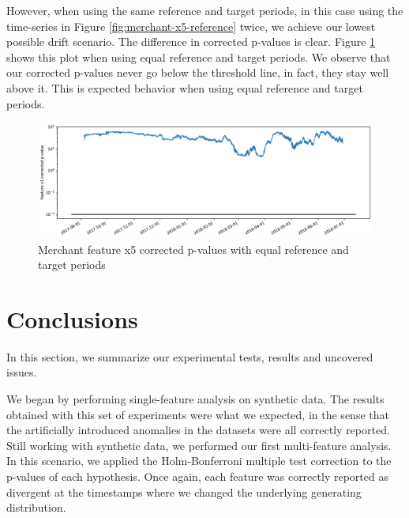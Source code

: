 However, when using the same reference and target periods, in this case using the time-series in Figure \ref{fig:merchant-x5-reference} twice, we achieve our lowest possible drift scenario. The difference in corrected p-values is clear. Figure \ref{fig:merchant2-x5-correctedpvalues} shows this plot when using equal reference and target periods. We observe that our corrected p-values never go below the threshold line, in fact, they stay well above it. This is expected behavior when using equal reference and target periods.
\begin{figure}[!htb]
    \begin{center}
      \includegraphics[scale=0.5]{figures/merchant2-x5-correctedpvalues.pdf}
      \caption{Merchant feature x5 corrected p-values with equal reference and target periods}
      \label{fig:merchant2-x5-correctedpvalues}
    \end{center}
\end{figure}


\section{Conclusions}
In this section, we summarize our experimental tests, results and uncovered issues.

We began by performing single-feature analysis on synthetic data. The results obtained with this set of experiments were what we expected, in the sense that the artificially introduced anomalies in the datasets were all correctly reported. Still working with synthetic data, we performed our first multi-feature analysis. In this scenario, we applied the Holm-Bonferroni multiple test correction to the p-values of each hypothesis. Once again, each feature was correctly reported as divergent at the timestamps where we changed the underlying generating distribution.


